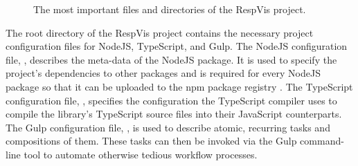 \begin{figure}[tp]
\centering
{}
\caption[RespVis Directory Structure]{
  The most important files and directories of the RespVis project. 
}
\label{fig:RespVisDirTree}
\end{figure}


The root directory of the RespVis project contains the necessary
project configuration files for NodeJS, TypeScript, and Gulp. The
NodeJS configuration file, , describes the
meta-data of the NodeJS package. It is used to specify the project's
dependencies to other packages and is required for every NodeJS
package so that it can be uploaded to the npm package registry
\parencite{npm}. The TypeScript configuration file,
, specifies the configuration the TypeScript
compiler uses to compile the library's TypeScript source files into
their JavaScript counterparts. The Gulp configuration file,
, is used to describe atomic, recurring tasks and
compositions of them. These tasks can then be invoked via the Gulp
command-line tool to automate otherwise tedious workflow processes.

